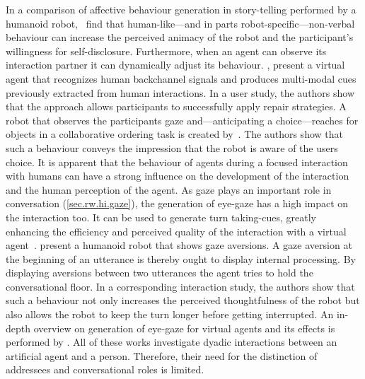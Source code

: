 In a comparison of affective behaviour generation in story-telling performed by a humanoid \gls{robot},~ find that human-like---and in parts \gls{robot}-specific---non-verbal behaviour can increase the perceived animacy of the \gls{robot} and the participant's willingness for self-disclosure.
Furthermore, when an agent can observe its interaction partner it can dynamically adjust its behaviour.
, present a \gls{virtual agent} that recognizes human backchannel signals and produces multi-modal  cues previously extracted from human interactions.
In a user study, the authors show that the approach allows participants to successfully apply repair strategies.
A \gls{robot} that observes the participants gaze and---anticipating a choice---reaches for objects in a collaborative ordering task is created by~.
The authors show that such a behaviour conveys the impression that the \gls{robot} is aware of the users choice.
It is apparent that the behaviour of agents during a \gls{focused interaction} with humans can have a strong influence on the development of the interaction and the human perception of the agent.
As gaze plays an important role in \gls{conversation} (\cref{sec.rw.hi.gaze}), the generation of eye-gaze has a high impact on the interaction too.
It can be used to generate \gls{turn taking}-cues, greatly enhancing the efficiency and perceived quality of the interaction with a \gls{virtual agent}~\cite{Cassell1999}.
 present a humanoid \gls{robot} that shows gaze aversions.
A gaze aversion at the beginning of an utterance is thereby ought to display internal processing.
By displaying aversions between two utterances the agent tries to hold the \gls{conversational floor}.
In a corresponding interaction study, the authors show that such a behaviour not only increases the perceived thoughtfulness of the \gls{robot} but also allows the \gls{robot} to keep the \gls{turn} longer before getting interrupted.
An in-depth overview on generation of eye-gaze for \glspl{virtual agent} and its effects is performed by .
All of these works investigate dyadic interactions between an \gls{artificial agent} and a person.
Therefore, their need for the distinction of \glspl{addressee} and \glspl{conversational role} is limited.

